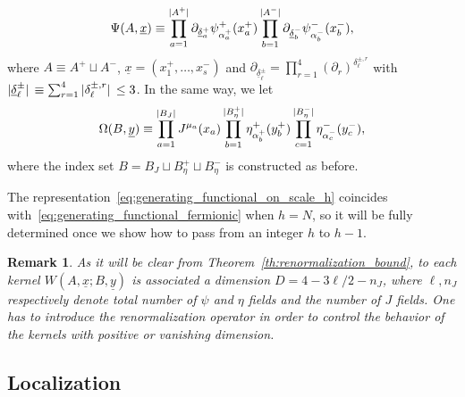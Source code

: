 \documentclass[a4paper, 11pt]{article}
\newcommand{\Src}{\Omega}
\theoremstyle{thm}
\newtheorem{rmk}{Remark}
\begin{document}
\begin{equation}
\label{eq:field_monomials}
\Psi(A, \underline{x}) \equiv \prod_{a = 1}^{\abs*{A^+}} \partial_{\underline{\delta}_a^+} \psi^+_{\alpha_a^+}(x_a^+) \prod_{b = 1}^{\abs*{A^-}} \partial_{\underline{\delta}_b^-} \psi^-_{\alpha_b^-}(x_b^-),
\end{equation}
where $A \equiv A^+ \sqcup A^-$, $\underline{x} = (x_1^+, \dots, x_s^-)$ and $\partial_{\underline{\delta}_\ell^\pm} = \prod_{r = 1}^4 (\partial_r)^{\delta_\ell^{\pm, r}}$ with $\abs*{\underline{\delta}_\ell^\pm} \equiv \sum_{r = 1}^4 \abs*{\delta_\ell^{\pm, r}} \le 3$. In the same way, we let
\begin{equation}
\label{eq:source_field_monomials}
\Src(B, \underline{y}) \equiv \prod_{a = 1}^{\abs*{B_J}} J^{\mu_a}(x_a) \prod_{b = 1}^{\abs*{B_{\eta}^+}} \eta^+_{\alpha^+_b}(y_b^+) \prod_{c = 1}^{\abs*{B_{\eta}^-}} \eta^-_{\alpha^-_c}(y_c^-),
\end{equation}
where the index set $B = B_J \sqcup B^+_\eta \sqcup B^-_\eta$ is constructed as before. 

The representation~\eqref{eq:generating_functional_on_scale_h} coincides with~\eqref{eq:generating_functional_fermionic} when $h = N$, so it will be fully determined once we show how to pass from an integer $h$ to $h-1$.
\begin{rmk} 
As it will be clear from Theorem~\ref{th:renormalization_bound}, to each kernel $W(A, \underline{x}; B, \underline{y})$ is associated a dimension $D=4-3\ell/2-n_J$, where $\ell, n_J$ respectively denote total number of $\psi$ and $\eta$ fields and the number of $J$ fields. One has to introduce the renormalization operator in order to control the behavior of the kernels with positive or vanishing dimension. 
\end{rmk}

\subsection{Localization}
\label{subsec:localization}
\end{document}
